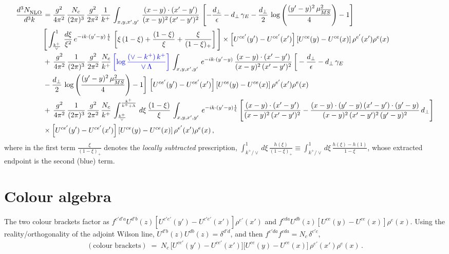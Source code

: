 \documentclass[10pt]{article}
\begin{document}
\begin{align}\label{eq:target}
    \frac{d^{3}N_{\rm NLO}^{\rm}}{d^{3}k}  & = \frac{g^{2}}{4\pi^{2}}\, \frac{N_{c}}{(2\pi)^{3}}\,\frac{g^{2}}{2\pi^{2}}\, \frac{1}{k^{+}}\,\int_{x,y,x',y'}\,\frac{(x-y)\cdot (x'-y')}{(x-y)^{2}\,(x'-y')^{2}}\,\left[-\frac{d_{\perp}}{\epsilon}-d_{\perp}\,\gamma_{E}-\frac{d_{\perp}}{2}\,\log{\left(\frac{(y'-y)^{2}\,\mu^{2}_{\overline{MS}}}{4}\right)}-1\right]\,\notag \\ & \Bigg[\int_{\frac{k^{+}}{\vee}}^{1}\,\frac{d\xi}{\xi^{2}}\,e^{-ik\cdot (y'-y)\,\frac{1}{\xi}}\,\left[\xi\,(1-\xi)+\frac{(1-\xi)}{\xi}+\frac{\xi}{(1-\xi)_{+}}\right]\Bigg]\times \left[U^{ce'}(y') - U^{ce'}(x')\right] \left[U^{ce}(y) - U^{ce}(x)\right] \rho^{e'}(x') \rho^{e}(x)\notag \\ &  +\, \frac{g^{2}}{4\pi^{2}}\, \frac{1}{(2\pi)^{3}}\,\frac{g^{2}}{2\pi^{2}}\, \frac{N_{c}}{k^{+}}\,{\color{blue}\left[\log{\frac{(\vee - k^{+})\, k^{+}}{\vee\,\Lambda}}\right]}\,\int_{x,y,x',y'}\,e^{-ik\cdot (y'-y)}\,\frac{(x-y)\cdot (x'-y')}{(x-y)^{2}\,(x'-y')^{2}}\,\bigg[-\frac{d_{\perp}}{\epsilon}-d_{\perp}\,\gamma_{E}\notag \\ & -\frac{d_{\perp}}{2}\,\log{\left(\frac{(y'-y)^{2}\,\mu^{2}_{\overline{MS}}}{4}\right)}-1\bigg]\,\left[U^{ce'}(y') - U^{ce'}(x')\right] \left[U^{ce}(y) - U^{ce}(x)\right] \rho^{e'}(x') \rho^{e}(x)\notag \\ & +\,\frac{g^{2}}{4\pi^{2}}\, \frac{1}{(2\pi)^{3}}\,\frac{g^{2}}{2\pi^{2}}\, \frac{N_{c}}{k^{+}}\,\int_{\frac{k^{+}}{\vee}}^{\frac{k^{+}}{k^{+}+\Lambda}}\,d\xi\, \frac{(1-\xi)}{\xi}\, \int_{x,y,x',y'}\,e^{-ik\cdot (y'-y)\frac{1}{\xi}}\,\Bigg[\frac{(x-y)\cdot (x'-y')}{(x-y)^{2}\, (x'-y')^{2}} -\frac{(x-y)\cdot (y'-y)\, (x'-y')\cdot (y'-y)}{(x-y)^{2}\,(x'-y')^{2}\,(y'-y)^{2}}\,d_{\perp}\Bigg]\notag \\ &  \times\left[U^{ce'}(y') - U^{ce'}(x')\right] \left[U^{ce}(y) - U^{ce}(x)\right] \rho^{e'}(x') \rho^{e}(x)\,,
\end{align}
where in the first term $\frac{\xi}{(1-\xi)_{+}}$ denotes the \emph{locally subtracted} prescription,
$\int_{k^{+}/\vee}^{1}d\xi\,\frac{h(\xi)}{(1-\xi)_{+}}\equiv\int_{k^{+}/\vee}^{1}d\xi\,\frac{h(\xi)-h(1)}{1-\xi}$,
whose extracted endpoint is the second (blue) term.

\section{Colour algebra}
The two colour brackets factor as $f^{c'd'a}U^{d'b}(z)[U^{c'e'}(y')-U^{c'e'}(x')]\rho^{e'}(x')$ and
$f^{cda}U^{db}(z)[U^{ce}(y)-U^{ce}(x)]\rho^{e}(x)$. Using the reality/orthogonality of the adjoint
Wilson line, $U^{d'b}(z)U^{db}(z)=\delta^{d'd}$, and then $f^{c'da}f^{cda}=N_{c}\,\delta^{c'c}$,
\begin{align}
(\text{colour brackets})\;=\;N_{c}\,\big[U^{ce'}(y')-U^{ce'}(x')\big]\big[U^{ce}(y)-U^{ce}(x)\big]\,\rho^{e'}(x')\rho^{e}(x)\,.
\end{align}
\end{document}

